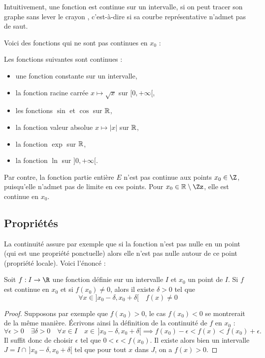 \documentclass[class=report,crop=false]{standalone}
\begin{document}

Intuitivement, une fonction est continue sur un intervalle, si on peut tracer son graphe
\og sans lever le crayon \fg{}, c'est-à-dire si sa courbe représentative n'admet pas de saut.

Voici des fonctions qui ne sont pas continues en $x_0$ :

\begin{exemple}
Les fonctions suivantes sont continues :
\begin{itemize}
\item une fonction constante sur un intervalle,
\item la fonction racine carrée $x\mapsto\sqrt{x}$ sur $[0,+\infty[$,
\item les fonctions $\sin$ et $\cos$ sur $\mathbb{R}$,
\item la fonction valeur absolue $x\mapsto\vert x\vert$ sur $\mathbb{R}$,
\item la fonction $\exp$ sur $\mathbb{R}$,
\item la fonction $\ln$ sur $]0,+\infty[$.
\end{itemize}

Par contre, la fonction partie entière $E$ n'est pas continue aux points $x_0\in\Z$,
puisqu'elle n'admet pas de limite en ces points. Pour $x_0\in \Rr \setminus \Zz$, elle est continue en $x_0$.

\end{exemple}

\subsection{Propriétés}

La continuité assure par exemple que si la fonction n'est pas nulle en un point (qui est une propriété ponctuelle) alors
elle n'est pas nulle autour de ce point (propriété locale). Voici l'énoncé :
\begin{lemme}
Soit $f:I\to\R$ une fonction définie sur un intervalle $I$ et $x_0$ un point de $I$.
Si $f$ est continue en $x_0$ et si $f(x_0)\neq 0$,
alors il existe $\delta>0$ tel que
\[
\forall x\in ]x_0-\delta,x_0+\delta [ \quad f(x)\neq 0
\]
\end{lemme}


\begin{proof}
Supposons par exemple que $f(x_0)>0$, le cas $f(x_0)<0$ se montrerait de la même manière. \'Ecrivons ainsi la définition de la continuité de $f$ en $x_0$ :
\[
\forall \epsilon>0 \quad \exists \delta>0 \quad \forall x\in I \quad  x\in \, ]x_0-\delta,x_0+\delta [
\implies f(x_0)-\epsilon < f(x) <f(x_0)+\epsilon.
\]
Il suffit donc de choisir $\epsilon$ tel que $0<\epsilon<f(x_0)$. Il existe alors bien un intervalle $J=I\cap \, ]x_0-\delta,x_0+\delta [$ tel que pour tout $x$ dans $J$, on a $f(x)>0$.
\end{proof}
\end{document}
